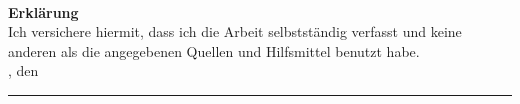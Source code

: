 \begin{titlepage}
\pagestyle{empty} %


\begin{flushright}
  {\large \textbf{\thesisTitle}} \\
  {\thesisSubTitle}
\end{flushright}

\vspace{5.0cm}

\noindent
{\huge{\textbf{Erklärung}}}\\[10mm]
  
\noindent
Ich versichere hiermit, dass ich die Arbeit selbstständig verfasst und keine anderen als die angegebenen Quellen und Hilfsmittel benutzt habe.\\[10mm]
\noindent
\place, den \deadline

\hspace{5.0cm}
\vspace{2.0cm}
\parbox{7.0cm}{
     \centering
     \rule{6cm}{1pt}\\
     \thesisauthor
}

\end{titlepage}